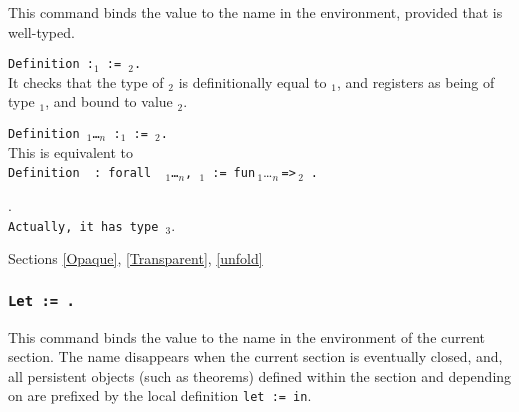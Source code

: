 This command binds the value {\term} to the name {\ident} in the
environment, provided that {\term} is well-typed.

\begin{ErrMsgs}
\item {}
\end{ErrMsgs}

\begin{Variants}
\item {\tt Definition {\ident} {\tt :}{\term$_1$} := {\term$_2$}.}\\
  It checks that the type of {\term$_2$} is definitionally equal to
  {\term$_1$}, and registers {\ident} as being of type {\term$_1$},
  and bound to value {\term$_2$}.
\item {\tt Definition {\ident} {\binder$_1$}\ldots{\binder$_n$}
       {\tt :}\term$_1$ {\tt :=} {\term$_2$}.}\\
  This is equivalent to \\
   {\tt Definition\,{\ident}\,{\tt :\,forall}\,%
       {\binder$_1$}\ldots{\binder$_n$}{\tt ,}\,\term$_1$\,{\tt :=}}\,%
       {\tt fun}\,{\binder$_1$}\ldots{\binder$_n$}\,{\tt =>}\,{\term$_2$}\,%
       {\tt .}
\end{Variants}

\begin{ErrMsgs}
\item {}.\\
    \texttt{Actually, it has type {\term$_3$}}.
\end{ErrMsgs}

\SeeAlso Sections \ref{Opaque}, \ref{Transparent}, \ref{unfold}

\subsubsection{\tt Let {\ident} := {\term}.
}

This command binds the value {\term} to the name {\ident} in the
environment of the current section. The name {\ident} disappears
when the current section is eventually closed, and, all
persistent objects (such as theorems) defined within the
section and depending on {\ident} are prefixed by the local definition
{\tt let {\ident} := {\term} in}.

\begin{ErrMsgs}
\item {}
\end{ErrMsgs}

